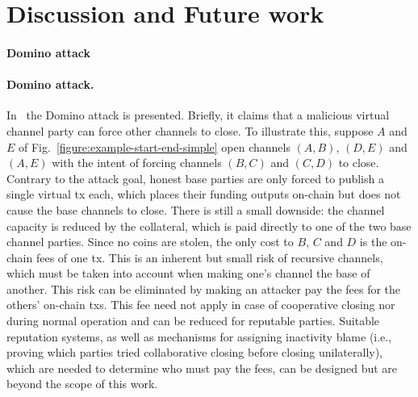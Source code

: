 \section{Discussion and Future work}
\label{sec:future-work}
\makeatletter%
%
  {\paragraph{Domino attack}}%
  {\paragraph{Domino attack.}}%
\makeatother%
In~\cite{donner} the Domino attack is presented. Briefly, it claims that a
malicious virtual channel party can force other channels to close. To
illustrate this, suppose $A$ and $E$ of
Fig.~\ref{figure:example-start-end-simple} open
channels
$(A, B)$, $(D, E)$ and $(A, E)$ with the intent of forcing channels $(B,
C)$ and $(C, D)$ to close. Contrary to the attack goal, honest
base parties are only
forced to publish a single virtual tx each, which places their funding
outputs on-chain but does not cause the base channels to close. There is still a
small downside:
the channel capacity is reduced by the collateral, which
is paid directly to one of the two base channel parties. Since no coins are
stolen, the only cost to $B$, $C$ and $D$ is the on-chain fees
of one tx. This is an inherent but small risk of
recursive channels, which must be taken into account when making one's
channel the base of another. This risk can be eliminated by making an attacker
pay the fees for the others' on-chain txs. This fee need not apply in
case of cooperative closing nor
during normal operation and can be reduced for reputable parties.
Suitable reputation systems, as well as mechanisms for assigning inactivity
blame (i.e., proving which parties tried collaborative closing before
closing unilaterally), which are needed to determine who must pay the fees,
can be designed but are beyond the scope of this work.

